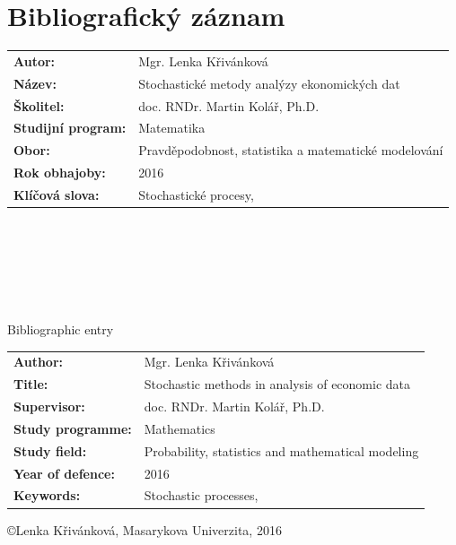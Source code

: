\documentclass[a4paper,12pt]{report}
\theoremstyle{definition} \newtheorem{definice}[veta]{Definice}
\theoremstyle{remark}
\begin{document}
\normalsize



\chapter*{Bibliografický záznam}
\setcounter{page}{1}

\begin{tabular}{p{3.9cm}  p{9.1cm}}
\textbf{Autor:} & Mgr. Lenka Křivánková \\
\textbf{Název:} & Stochastické metody analýzy ekonomických dat \\
\textbf{Školitel:} & doc. RNDr. Martin Kolář, Ph.D.  \\
\textbf{Studijní program:} & Matematika \\
\textbf{Obor:} & Pravděpodobnost, statistika a matematické modelování \\
\textbf{Rok obhajoby:} & 2016 \\
\textbf{Klíčová slova:} & Stochastické procesy, \\
\end{tabular}
\\\\\\\\\\

\begin{flushright} {{\Huge Bibliographic entry}} \vspace{38pt} \end{flushright}

\hspace{-0.7cm}
\begin{tabular}{p{3.9cm}  p{9.1cm}}
\textbf{Author:} & Mgr. Lenka Křivánková \\
\textbf{Title:} & Stochastic methods in analysis of economic data \\
\textbf{Supervisor:} & doc. RNDr. Martin Kolář, Ph.D.  \\
\textbf{Study programme:} & Mathematics \\
\textbf{Study field:} & Probability, statistics and mathematical modeling \\
\textbf{Year of defence:} & 2016 \\
\textbf{Keywords:} & Stochastic processes, \\
\end{tabular}
\newpage
\pagestyle{empty}
\null
\vfill
\begin{center}
\copyright \quad Lenka Křivánková, Masarykova Univerzita, 2016
\end{center}
\end{document}
